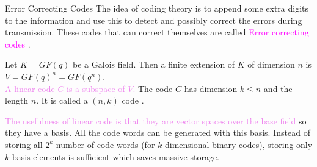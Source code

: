 \documentclass{beamer}
\begin{document}
\begin{frame}{Error Correcting Codes}
  The idea of coding theory is to append some extra digits to the information and use this to detect and possibly correct the errors during transmission. These codes \textcolor{green!50!black}{that can correct themselves are called} \textcolor{magenta}{Error correcting codes} \cite{coding}.
  \vspace{3mm}


\begin{definition}
Let \(K=GF(q)\) be a Galois field. Then a finite extension of \(K\) of dimension \(n\) is \(V=GF(q)^n=GF(q^n)\).\\
  \textcolor{violet}{A linear code \(C\) is a subspace of \(V\).} The code \(C\) has dimension \(k \leq n\) and the length \(n\). It is called a \((n,k)\) code \cite{error_correct}.
\end{definition}

  \begin{tcolorbox}[colback=white, colframe=blue!40, boxsep=1mm]
\textcolor{violet}{The usefulness of linear code is that they are vector spaces over the base field} so they have a basis. All the code words can be generated with this basis. Instead of storing all \(2^k\) number of code words (for \(k\)-dimensional binary codes), storing only \(k\) basis elements is sufficient which saves massive storage.
\end{tcolorbox}
\end{frame}
\end{document}
